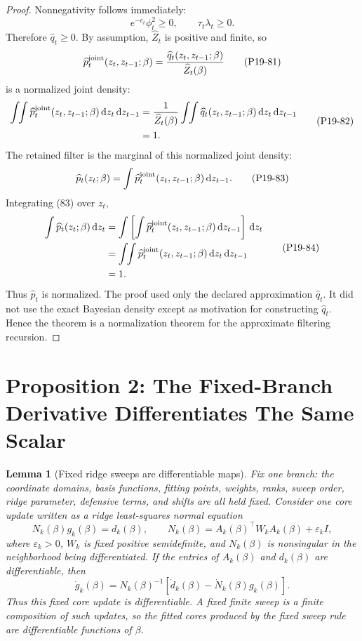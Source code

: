\documentclass[11pt]{article}
\newtheorem{lemma}{Lemma}
\newcommand{\dd}{\,\mathrm d}
\begin{document}
\begin{proof}
Nonnegativity follows immediately:
\[
    e^{-c_t}\phi_t^2\ge0,
    \qquad
    \tau_t\lambda_t\ge0.
    \tag{P19-80}
\]
Therefore \(\widehat q_t\ge0\).  By assumption,
\(\widehat Z_t\) is positive and finite, so
\[
    \widehat p_t^{\rm joint}(z_t,z_{t-1};\beta)
    =
    \frac{\widehat q_t(z_t,z_{t-1};\beta)}
    {\widehat Z_t(\beta)}
    \tag{P19-81}
\]
is a normalized joint density:
\[
\begin{aligned}
    \int\!\!\int
    \widehat p_t^{\rm joint}(z_t,z_{t-1};\beta)
    \dd z_t\dd z_{t-1}
    &=
    \frac{1}{\widehat Z_t(\beta)}
    \int\!\!\int
    \widehat q_t(z_t,z_{t-1};\beta)
    \dd z_t\dd z_{t-1}\\
    &=
    1.
\end{aligned}
\tag{P19-82}
\]
The retained filter is the marginal of this normalized joint density:
\[
    \widehat p_t(z_t;\beta)
    =
    \int
    \widehat p_t^{\rm joint}(z_t,z_{t-1};\beta)
    \dd z_{t-1}.
    \tag{P19-83}
\]
Integrating (83) over \(z_t\),
\[
\begin{aligned}
    \int \widehat p_t(z_t;\beta)\dd z_t
    &=
    \int
    \left[
    \int \widehat p_t^{\rm joint}(z_t,z_{t-1};\beta)
    \dd z_{t-1}
    \right]\dd z_t\\
    &=
    \int\!\!\int
    \widehat p_t^{\rm joint}(z_t,z_{t-1};\beta)
    \dd z_t\dd z_{t-1}\\
    &=
    1.
\end{aligned}
\tag{P19-84}
\]
Thus \(\widehat p_t\) is normalized.  The proof used only the declared
approximation \(\widehat q_t\).  It did not use the exact Bayesian density
except as motivation for constructing \(\widehat q_t\).  Hence the theorem is a
normalization theorem for the approximate filtering recursion.
\end{proof}

\section{Proposition 2: The Fixed-Branch Derivative Differentiates The Same Scalar}

\begin{lemma}[Fixed ridge sweeps are differentiable maps]
Fix one branch: the coordinate domains, basis functions, fitting points,
weights, ranks, sweep order, ridge parameter, defensive terms, and shifts are
all held fixed.  Consider one core update written as a ridge least-squares
normal equation
\[
    N_k(\beta)g_k(\beta)=d_k(\beta),
    \qquad
    N_k(\beta)=A_k(\beta)^\top W_k A_k(\beta)+\varepsilon_k I,
\]
where \(\varepsilon_k>0\), \(W_k\) is fixed positive semidefinite, and
\(N_k(\beta)\) is nonsingular in the neighborhood being differentiated.  If the
entries of \(A_k(\beta)\) and \(d_k(\beta)\) are differentiable, then
\[
    \dot g_k(\beta)
    =
    N_k(\beta)^{-1}
    \left[
    \dot d_k(\beta)-\dot N_k(\beta)g_k(\beta)
    \right].
\]
Thus this fixed core update is differentiable.  A fixed finite sweep is a
finite composition of such updates, so the fitted cores produced by the fixed
sweep rule are differentiable functions of \(\beta\).
\end{lemma}
\end{document}
